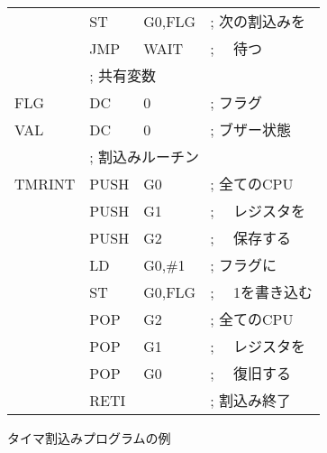 \begin{figure}[btp]
{\begin{center}
\begin{tabular}{|l|l l l|}
      & ST    & G0,FLG            & ; 次の割込みを   \\
      & JMP   & WAIT              & ; 　待つ         \\
      & \multicolumn{3}{|l|}{; 共有変数}             \\
FLG   & DC    & 0                 & ; フラグ         \\
VAL   & DC    & 0                 & ; ブザー状態     \\
      & \multicolumn{3}{|l|}{; 割込みルーチン}       \\
TMRINT& PUSH  & G0                & ; 全てのCPU      \\
      & PUSH  & G1                & ; 　レジスタを   \\
      & PUSH  & G2                & ; 　保存する     \\
      & LD    & G0,\#1            & ; フラグに       \\
      & ST    & G0,FLG            & ; 　1を書き込む  \\
      & POP   & G2                & ; 全てのCPU      \\
      & POP   & G1                & ; 　レジスタを   \\
      & POP   & G0                & ; 　復旧する     \\
      & RETI  &                   & ; 割込み終了     \\
\hline
\end{tabular}
\end{center}}
\caption{タイマ割込みプログラムの例}
\label{fig:chap6:timer}
\end{figure}

